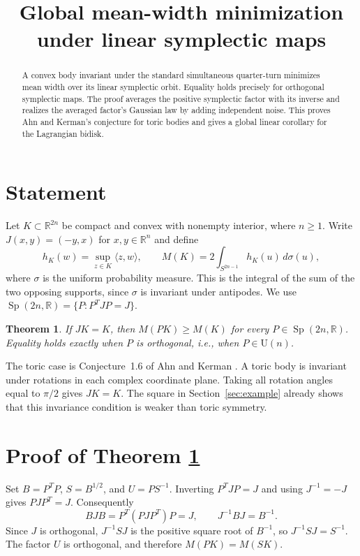\documentclass[11pt,a4paper]{amsart}
\title[Global symplectic mean-width minimization]{Global mean-width minimization under linear symplectic maps}
\date{}
\newtheorem{theorem}{Theorem}
\newcommand{\Sp}{\operatorname{Sp}}
\newcommand{\U}{\mathrm U}
\begin{document}
\begin{abstract}
A convex body invariant under the standard simultaneous quarter-turn minimizes mean width over its linear symplectic orbit. Equality holds precisely for orthogonal symplectic maps. The proof averages the positive symplectic factor with its inverse and realizes the averaged factor's Gaussian law by adding independent noise. This proves Ahn and Kerman's conjecture for toric bodies and gives a global linear corollary for the Lagrangian bidisk.
\end{abstract}
\maketitle

\section{Statement}
Let \(K\subset\mathbb R^{2n}\) be compact and convex with nonempty interior, where \(n\geq 1\). Write \(J(x,y)=(-y,x)\) for \(x,y\in\mathbb R^n\) and define
\[
  h_K(w)=\sup_{z\in K}\langle z,w\rangle,\qquad
  M(K)=2\int_{S^{2n-1}}h_K(u)\,d\sigma(u),
\]
where \(\sigma\) is the uniform probability measure. This is the integral of the sum of the two opposing supports, since \(\sigma\) is invariant under antipodes. We use \(\Sp(2n,\mathbb R)=\{P:P^TJP=J\}\).

\begin{theorem}\label{thm:main}
If \(JK=K\), then \(M(PK)\ge M(K)\) for every \(P\in\Sp(2n,\mathbb R)\). Equality holds exactly when \(P\) is orthogonal, i.e., when \(P\in\U(n)\).
\end{theorem}

The toric case is Conjecture~1.6 of Ahn and Kerman \cite{ahn-kerman}. A toric body is invariant under rotations in each complex coordinate plane. Taking all rotation angles equal to \(\pi/2\) gives \(JK=K\). The square in Section~\ref{sec:example} already shows that this invariance condition is weaker than toric symmetry.

\section{Proof of Theorem \ref{thm:main}}
Set \(B=P^TP\), \(S=B^{1/2}\), and \(U=PS^{-1}\). Inverting \(P^TJP=J\) and using \(J^{-1}=-J\) gives \(PJP^T=J\). Consequently
\[
  BJB=P^T(PJP^T)P=J,\qquad J^{-1}BJ=B^{-1}.
\]
Since \(J\) is orthogonal, \(J^{-1}SJ\) is the positive square root of \(B^{-1}\), so \(J^{-1}SJ=S^{-1}\). The factor \(U\) is orthogonal, and therefore \(M(PK)=M(SK)\).
\end{document}
